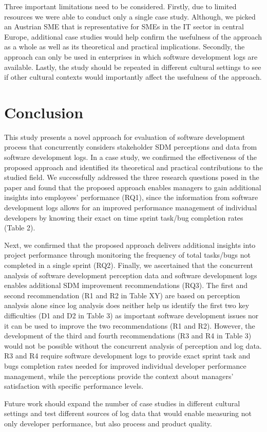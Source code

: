 Three important limitations need to be considered. Firstly, due to limited resources we were able to conduct only a single case study. Although, we picked an Austrian SME that is representative for SMEs in the IT sector in central Europe, additional case studies would help confirm the usefulness of the approach as a whole as well as its theoretical and practical implications. Secondly, the approach can only be used in enterprises in which software development logs are available. Lastly, the study should be repeated in different cultural settings to see if other cultural contexts would importantly affect the usefulness of the approach.

\section{Conclusion}
This study presents a novel approach for evaluation of software development process that concurrently considers stakeholder SDM perceptions and data from software development logs. In a case study, we confirmed the effectiveness of the proposed approach and identified its theoretical and practical contributions to the studied field. We successfully addressed the three research questions posed in the paper and found that the proposed approach enables managers to gain additional insights into employees’ performance (RQ1), since the information from software development logs allows for an improved performance management of individual developers by knowing their exact on time sprint task/bug completion rates (Table 2). 

Next, we confirmed that the proposed approach delivers additional insights into project performance through monitoring the frequency of total tasks/bugs not completed in a single sprint (RQ2). Finally, we ascertained that the concurrent analysis of software development perception data and software development logs enables additional SDM improvement recommendations (RQ3). The first and second recommendation (R1 and R2 in Table XY) are based on perception analysis alone since log analysis does neither help us identify the first two key difficulties (D1 and D2 in Table 3) as important software development issues nor it can be used to improve the two recommendations (R1 and R2). However, the development of the third and fourth recommendations (R3 and R4 in Table 3) would not be possible without the concurrent analysis of perception and log data.  R3 and R4 require software development logs to provide exact sprint task and bugs completion rates needed for improved individual developer performance management, while the perceptions provide the context about managers’ satisfaction with specific performance levels. 

Future work should expand the number of case studies in different cultural settings and test different sources of log data that would enable measuring not only developer performance, but also process and product quality.